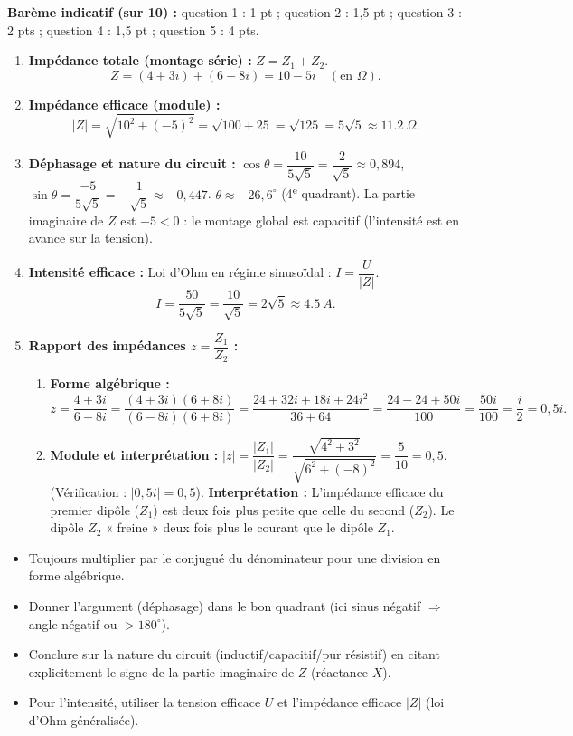 \documentclass[11pt]{article}
\newcommand{\cle}[1]{{\popxbold\color{popdark}#1}}
\begin{document}
\begin{corrige}
\textbf{Barème indicatif (sur 10) :} question 1 : 1 pt ; question 2 : 1,5 pt ; question 3 : 2 pts ; question 4 : 1,5 pt ; question 5 : 4 pts.

\begin{enumerate}
\item \textbf{Impédance totale (montage série) :} $Z = Z_1 + Z_2$.
\[ Z = (4 + 3i) + (6 - 8i) = 10 - 5i \quad (\text{en } \Omega). \]
\item \textbf{Impédance efficace (module) :}
\[ |Z| = \sqrt{10^2 + (-5)^2} = \sqrt{100 + 25} = \sqrt{125} = 5\sqrt{5} \approx \SI{11,2}{\Omega}. \]
\item \textbf{Déphasage et nature du circuit :}
$\cos\theta = \dfrac{10}{5\sqrt{5}} = \dfrac{2}{\sqrt{5}} \approx 0,894$, $\sin\theta = \dfrac{-5}{5\sqrt{5}} = -\dfrac{1}{\sqrt{5}} \approx -0,447$.
$\theta \approx -26,6^\circ$ (4\textsuperscript{e} quadrant).
La partie imaginaire de $Z$ est $-5 < 0$ : le montage global est \cle{capacitif} (l'intensité est en avance sur la tension).
\item \textbf{Intensité efficace :} Loi d'Ohm en régime sinusoïdal : $I = \dfrac{U}{|Z|}$.
\[ I = \dfrac{50}{5\sqrt{5}} = \dfrac{10}{\sqrt{5}} = 2\sqrt{5} \approx \SI{4,5}{A}. \]
\item \textbf{Rapport des impédances $z = \dfrac{Z_1}{Z_2}$ :}
\begin{enumerate}
\item \textbf{Forme algébrique :}
\[ z = \dfrac{4+3i}{6-8i} = \dfrac{(4+3i)(6+8i)}{(6-8i)(6+8i)} = \dfrac{24 + 32i + 18i + 24i^2}{36 + 64} = \dfrac{24 - 24 + 50i}{100} = \dfrac{50i}{100} = \dfrac{i}{2} = 0,5i. \]
\item \textbf{Module et interprétation :}
$|z| = \dfrac{|Z_1|}{|Z_2|} = \dfrac{\sqrt{4^2+3^2}}{\sqrt{6^2+(-8)^2}} = \dfrac{5}{10} = 0,5$. (Vérification : $|0,5i| = 0,5$).
\textbf{Interprétation :} L'impédance efficace du premier dipôle ($Z_1$) est deux fois plus petite que celle du second ($Z_2$). Le dipôle $Z_2$ « freine » deux fois plus le courant que le dipôle $Z_1$.
\end{enumerate}
\end{enumerate}

\begin{attention}
\begin{itemize}
\item Toujours multiplier par le conjugué du dénominateur pour une division en forme algébrique.
\item Donner l'argument (déphasage) dans le bon quadrant (ici sinus négatif $\Rightarrow$ angle négatif ou $> 180^\circ$).
\item Conclure sur la nature du circuit (inductif/capacitif/pur résistif) en citant explicitement le signe de la partie imaginaire de $Z$ (réactance $X$).
\item Pour l'intensité, utiliser la tension efficace $U$ et l'impédance efficace $|Z|$ (loi d'Ohm généralisée).
\end{itemize}
\end{attention}
\end{corrige}
\end{document}
